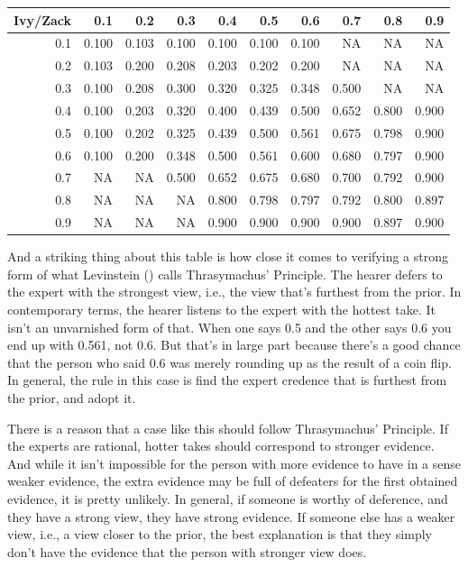 \documentclass[
  10pt,
  letterpaper,
  DIV=11,
  numbers=noendperiod,
  twoside]{scrartcl}
\begin{document}
\begin{tabular}{rrrrrrrrrr}
\toprule
Ivy/Zack & 0.1 & 0.2 & 0.3 & 0.4 & 0.5 & 0.6 & 0.7 & 0.8 & 0.9\\
\midrule
0.1 & 0.100 & 0.103 & 0.100 & 0.100 & 0.100 & 0.100 & NA & NA & NA\\
0.2 & 0.103 & 0.200 & 0.208 & 0.203 & 0.202 & 0.200 & NA & NA & NA\\
0.3 & 0.100 & 0.208 & 0.300 & 0.320 & 0.325 & 0.348 & 0.500 & NA & NA\\
0.4 & 0.100 & 0.203 & 0.320 & 0.400 & 0.439 & 0.500 & 0.652 & 0.800 & 0.900\\
0.5 & 0.100 & 0.202 & 0.325 & 0.439 & 0.500 & 0.561 & 0.675 & 0.798 & 0.900\\
0.6 & 0.100 & 0.200 & 0.348 & 0.500 & 0.561 & 0.600 & 0.680 & 0.797 & 0.900\\
0.7 & NA & NA & 0.500 & 0.652 & 0.675 & 0.680 & 0.700 & 0.792 & 0.900\\
0.8 & NA & NA & NA & 0.800 & 0.798 & 0.797 & 0.792 & 0.800 & 0.897\\
0.9 & NA & NA & NA & 0.900 & 0.900 & 0.900 & 0.900 & 0.897 & 0.900\\
\bottomrule
\end{tabular}

And a striking thing about this table is how close it comes to verifying
a strong form of what Levinstein ()
calls Thrasymachus' Principle. The hearer defers to the expert with the
strongest view, i.e., the view that's furthest from the prior. In
contemporary terms, the hearer listens to the expert with the hottest
take. It isn't an unvarnished form of that. When one says 0.5 and the
other says 0.6 you end up with 0.561, not 0.6. But that's in large part
because there's a good chance that the person who said 0.6 was merely
rounding up as the result of a coin flip. In general, the rule in this
case is find the expert credence that is furthest from the prior, and
adopt it.

There is a reason that a case like this should follow Thrasymachus'
Principle. If the experts are rational, hotter takes should correspond
to stronger evidence. And while it isn't impossible for the person with
more evidence to have in a sense weaker evidence, the extra evidence may
be full of defeaters for the first obtained evidence, it is pretty
unlikely. In general, if someone is worthy of deference, and they have a
strong view, they have strong evidence. If someone else has a weaker
view, i.e., a view closer to the prior, the best explanation is that
they simply don't have the evidence that the person with stronger view
does.
\end{document}
